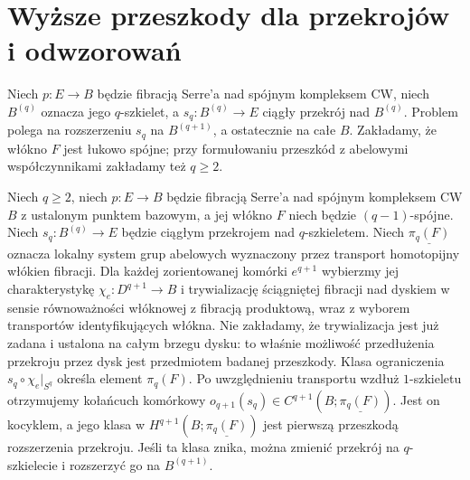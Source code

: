 \section{Wyższe przeszkody dla przekrojów i odwzorowań}
\begin{definicja}
Niech $p:E\to B$ będzie fibracją Serre'a nad spójnym kompleksem CW,
niech $B^{(q)}$ oznacza jego $q$-szkielet, a $s_q:B^{(q)}\to E$
ciągły przekrój nad $B^{(q)}$. Problem polega na rozszerzeniu
$s_q$ na $B^{(q+1)}$, a ostatecznie na całe $B$.
Zakładamy, że włókno $F$ jest łukowo spójne; przy formułowaniu
przeszkód z abelowymi współczynnikami zakładamy też $q\ge2$.
\end{definicja}
\begin{stwierdzenie}
\label{prop:xviii-obstruction}
Niech $q\ge2$, niech $p:E\to B$ będzie fibracją
Serre'a nad spójnym kompleksem CW $B$ z ustalonym
punktem bazowym, a jej włókno $F$ niech będzie
$(q-1)$-spójne. Niech
$s_q:B^{(q)}\to E$ będzie ciągłym przekrojem
nad $q$-szkieletem. Niech
$\underline{\pi_q(F)}$ oznacza lokalny system
grup abelowych wyznaczony przez transport
homotopijny włókien fibracji.
Dla każdej zorientowanej komórki $e^{q+1}$ wybierzmy
jej charakterystykę $\chi_e:D^{q+1}\to B$ i trywializację
ściągniętej fibracji nad dyskiem w sensie równoważności
włóknowej z fibracją produktową, wraz z wyborem transportów
identyfikujących włókna. Nie zakładamy, że trywializacja
jest już zadana i ustalona na całym brzegu dysku:
to właśnie możliwość przedłużenia przekroju przez dysk
jest przedmiotem badanej przeszkody.
Klasa ograniczenia
$s_q\circ\chi_e|_{S^q}$ określa element $\pi_q(F)$.
Po uwzględnieniu transportu wzdłuż $1$-szkieletu otrzymujemy
kołańcuch komórkowy
$o_{q+1}(s_q)\in C^{q+1}(B;\underline{\pi_q(F)})$.
Jest on kocyklem, a jego klasa w
$H^{q+1}(B;\underline{\pi_q(F)})$ jest pierwszą przeszkodą
rozszerzenia przekroju. Jeśli ta klasa znika, można zmienić
przekrój na $q$-szkielecie i rozszerzyć go na $B^{(q+1)}$.
\end{stwierdzenie}
